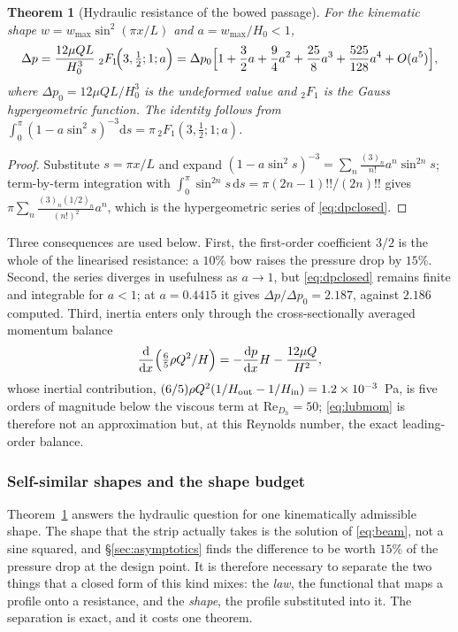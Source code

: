 \documentclass[11pt,a4paper]{article}
\newtheorem{theorem}{Theorem}[section]
\newcommand{\dd}{\mathrm{d}}
\newcommand{\ReDh}{\mathrm{Re}_{D_h}}
\begin{document}
\begin{theorem}[Hydraulic resistance of the bowed passage]
\label{thm:pressure}
For the kinematic shape $w=w_{\max}\sin^2(\pi x/L)$ and $a=w_{\max}/H_0<1$,
\begin{equation}
\Delta p=\frac{12\mu QL}{H_0^{3}}\;{}_2F_1\!\Bigl(3,\tfrac12;1;a\Bigr)
=\Delta p_0\Bigl[1+\frac32a+\frac94a^2+\frac{25}{8}a^3+\frac{525}{128}a^4+O(a^5)\Bigr],
\label{eq:dpclosed}
\end{equation}
where $\Delta p_0=12\mu QL/H_0^3$ is the undeformed value and ${}_2F_1$ is the Gauss
hypergeometric function. The identity follows from
$\int_0^\pi(1-a\sin^2s)^{-3}\dd s=\pi\,{}_2F_1(3,\tfrac12;1;a)$.
\end{theorem}

\begin{proof}
Substitute $s=\pi x/L$ and expand $(1-a\sin^2s)^{-3}=\sum_n\frac{(3)_n}{n!}a^n\sin^{2n}s$;
term-by-term integration with $\int_0^\pi\sin^{2n}s\,\dd s=\pi(2n-1)!!/(2n)!!$ gives
$\pi\sum_n\frac{(3)_n(1/2)_n}{(n!)^2}a^n$, which is the hypergeometric series of
\eqref{eq:dpclosed}.
\end{proof}

Three consequences are used below. First, the first-order coefficient $3/2$ is the whole of
the linearised resistance: a $10\%$ bow raises the pressure drop by $15\%$. Second, the series
diverges in usefulness as $a\to1$, but \eqref{eq:dpclosed} remains finite and integrable for
$a<1$; at $a=0.4415$ it gives $\Delta p/\Delta p_0=2.187$, against $2.186$ computed. Third,
inertia enters only through the cross-sectionally averaged momentum balance
\begin{equation}
\frac{\dd}{\dd x}\Bigl(\tfrac65\rho Q^2/H\Bigr)=-\frac{\dd p}{\dd x}H-\frac{12\mu Q}{H^2},
\label{eq:averaged}
\end{equation}
whose inertial contribution, $(6/5)\rho Q^2(1/H_{\rm out}-1/H_{\rm in})=1.2\times10^{-3}$~Pa,
is five orders of magnitude below the viscous term at $\ReDh=50$; \eqref{eq:lubmom} is
therefore not an approximation but, at this Reynolds number, the exact leading-order balance.

\subsubsection{Self-similar shapes and the shape budget}
\label{sec:selfsimilar}

Theorem~\ref{thm:pressure} answers the hydraulic question for one kinematically admissible
shape. The shape that the strip actually takes is the solution of \eqref{eq:beam}, not a sine
squared, and \S\ref{sec:asymptotics} finds the difference to be worth $15\%$ of the pressure
drop at the design point. It is therefore necessary to separate the two things that a closed
form of this kind mixes: the \emph{law}, the functional that maps a profile onto a resistance,
and the \emph{shape}, the profile substituted into it. The separation is exact, and it costs
one theorem.
\end{document}

